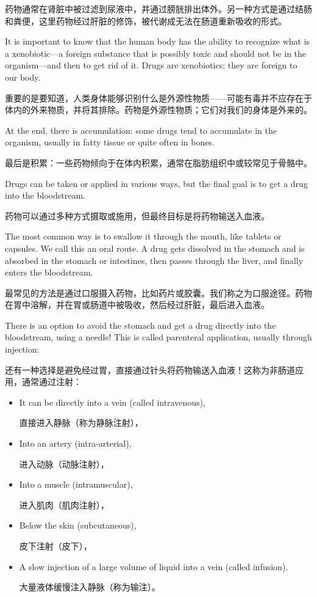 \documentclass[dvipsnames, svgnames,a4paper,11pt]{article}
\begin{document}
药物通常在肾脏中被过滤到尿液中，并通过膀胱排出体外。另一种方式是通过结肠和粪便，这里药物经过肝脏的修饰，被代谢成无法在肠道重新吸收的形式。

It is important to know that the human body has the ability to recognize what is a xenobiotic—a foreign substance that is possibly toxic and should not be in the organism—and then to get rid of it. Drugs are xenobiotics; they are foreign to our body.

重要的是要知道，人类身体能够识别什么是外源性物质——可能有毒并不应存在于体内的外来物质，并将其排除。药物是外源性物质；它们对我们的身体是外来的。

At the end, there is accumulation: some drugs tend to accumulate in the organism, usually in fatty tissue or quite often in bones.

最后是积累：一些药物倾向于在体内积累，通常在脂肪组织中或较常见于骨骼中。

Drugs can be taken or applied in various ways, but the final goal is to get a drug into the bloodstream.

药物可以通过多种方式摄取或施用，但最终目标是将药物输送入血液。

The most common way is to swallow it through the mouth, like tablets or capsules. We call this an oral route. A drug gets dissolved in the stomach and is absorbed in the stomach or intestines, then passes through the liver, and finally enters the bloodstream.

最常见的方法是通过口服摄入药物，比如药片或胶囊。我们称之为口服途径。药物在胃中溶解，并在胃或肠道中被吸收，然后经过肝脏，最后进入血液。

There is an option to avoid the stomach and get a drug directly into the bloodstream, using a needle! This is called parenteral application, usually through injection:

还有一种选择是避免经过胃，直接通过针头将药物输送入血液！这称为非肠道应用，通常通过注射：

\begin{itemize}

      \item It can be directly into a vein (called intravenous),

            直接进入静脉（称为静脉注射），

      \item Into an artery (intra-arterial),

            进入动脉（动脉注射），

      \item Into a muscle (intramuscular),

            进入肌肉（肌肉注射），

      \item Below the skin (subcutaneous),

            皮下注射（皮下），

      \item A slow injection of a large volume of liquid into a vein (called infusion).

            大量液体缓慢注入静脉（称为输注）。

\end{itemize}
\end{document}
